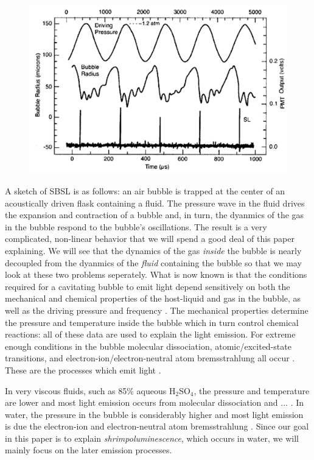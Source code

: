 \documentclass[rmp,aps,nofootinbib,superscriptaddress,floatfix]{revtex4-2}
\begin{document}
\begin{figure}
\includegraphics[width=0.6\linewidth]{figs/pulses}
    \caption{\cite{brenner2002single,crum1994sonoluminescence}}
\label{fig:pulses}
\end{figure}

A sketch of SBSL is as follows: an air bubble is trapped at the center of an acoustically driven flask containing a fluid. The pressure wave in the fluid drives the expansion and contraction of a bubble and, in turn, the dyanmics of the gas in the bubble respond to the bubble's oscillations. The result is a very complicated, non-linear behavior that we will spend a good deal of this paper explaining. We will see that the dynamics of the gas \emph{inside} the bubble is nearly decoupled from the dyanmics of the \emph{fluid} containing the bubble so that we may look at these two problems seperately. What is now known is that the conditions required for a cavitating bubble to emit light depend sensitively on both the mechanical and chemical properties of the host-liquid and gas in the bubble, as well as the driving pressure and frequency \cite{brenner2002single,suslick2008inside}. The mechanical properties determine the pressure and temperature inside the bubble which in turn control chemical reactions: all of these data are used to explain the light emission. For extreme enough conditions in the bubble molecular dissociation, atomic/excited-state transitions, and electron-ion/electron-neutral atom bremsstrahlung all occur \cite{}. These are the processes which emit light \cite{}. 

In very viscous fluids, such as 85\% aqueous H$_2$SO$_4$, the pressure and temperature are lower and most light emission occurs from molecular dissociation and ... \cite{}. In water, the pressure in the bubble is considerably higher and most light emission is due the electron-ion and electron-neutral atom bremsstrahlung \cite{}. Since our goal in this paper is to explain \emph{shrimpoluminescence}, which occurs in water, we will mainly focus on the later emission processes.
\end{document}
